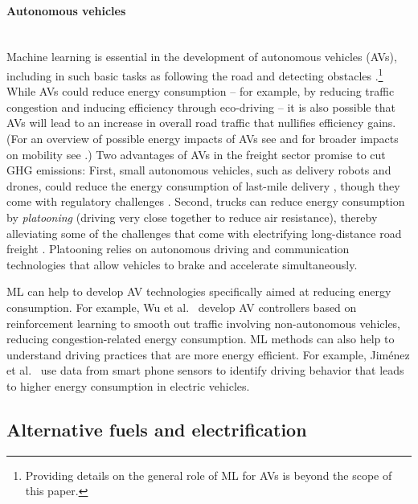 \documentclass[11pt]{report}
\newcommand{\et}{et al.~}
\newcommand{\Gap}{\texorpdfstring{\hfill}{}}
\newcommand{\HighRisk}{\texorpdfstring{{\small\emph{\color{orange}{\fbox{Uncertain Impact}}}}}{}}
\begin{document}
\paragraph*{Autonomous vehicles}\Gap\textbf{\HighRisk}\mbox{}\\Machine learning is essential in the development of autonomous vehicles (AVs), including in such basic tasks as following the road and detecting obstacles \cite{DBLP:journals/corr/BojarskiTDFFGJM16}.\footnote{Providing details on the general role of ML for AVs is beyond the scope of this paper.} While AVs could reduce energy consumption -- for example, by reducing traffic congestion and inducing efficiency through eco-driving -- it is also possible that AVs will lead to an increase in overall road traffic that nullifies efficiency gains. (For an overview of possible energy impacts of AVs see \cite{WADUD20161, Brown2014} and for broader impacts on mobility see \cite{Hancock7684}.)  Two advantages of AVs in the freight sector promise to cut GHG emissions: 
First, small autonomous vehicles, such as delivery robots and drones, could reduce the energy consumption of last-mile delivery \cite{samaras2018drones}, though they come with regulatory challenges \cite{marks2019law}. Second, trucks can reduce energy consumption by \emph{platooning} (driving very close together to reduce air resistance), thereby alleviating some of the challenges that come with electrifying long-distance road freight \cite{Guttenberg_2017}. Platooning relies on autonomous driving and communication technologies that allow vehicles to brake and accelerate simultaneously.

ML can help to develop AV technologies specifically aimed at reducing energy consumption. For example, Wu \et\cite{Wu2017EmergentBI,wu2017flow} develop AV controllers based on reinforcement learning to smooth out traffic involving non-autonomous vehicles, reducing congestion-related energy consumption. ML methods can also help to understand driving practices that are more energy efficient. For example, Jim\'enez et al.~\cite{en11020412} use data from smart phone sensors to identify driving behavior that leads to higher energy consumption in electric vehicles.

\subsection{Alternative fuels and electrification}\label{sec:TFuels}
\end{document}
